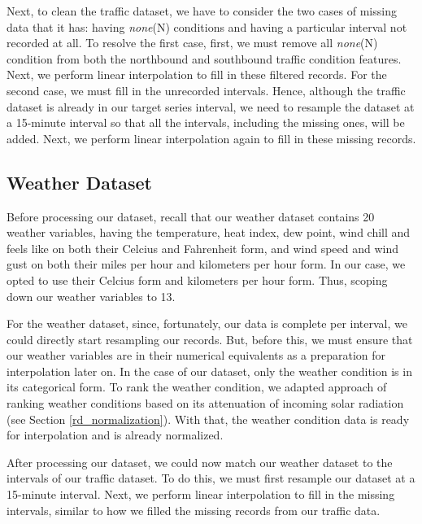 Next, to clean the traffic dataset, we have to consider the two cases of missing data that it has: having \textit{none}(N) conditions and having a particular interval not recorded at all. To resolve the first case, first, we must remove all \textit{none}(N) condition from both the northbound and southbound traffic condition features. Next, we perform linear interpolation to fill in these filtered records. For the second case, we must fill in the unrecorded intervals. Hence, although the traffic dataset is already in our target series interval, we need to resample the dataset at a 15-minute interval so that all the intervals, including the missing ones, will be added. Next, we perform linear interpolation again to fill in these missing records.



\subsection{Weather Dataset}
Before processing our dataset, recall that our weather dataset contains 20 weather variables, having the temperature, heat index, dew point, wind chill and feels like on both their Celcius and Fahrenheit form, and wind speed and wind gust on both their miles per hour and kilometers per hour form. In our case, we opted to use their Celcius form and kilometers per hour form. Thus, scoping down our weather variables to 13.

For the weather dataset, since, fortunately, our data is complete per interval, we could directly start resampling our records. But, before this, we must ensure that our weather variables are in their numerical equivalents as a preparation for interpolation later on. In the case of our dataset, only the weather condition is in its categorical form. To rank the weather condition, we adapted  approach of ranking weather conditions based on its attenuation of incoming solar radiation (see Section \ref{rd_normalization}). With that, the weather condition data is ready for interpolation and is already normalized.

After processing our dataset, we could now match our weather dataset to the intervals of our traffic dataset. To do this, we must first resample our dataset at a 15-minute interval. Next, we perform linear interpolation to fill in the missing intervals, similar to how we filled the missing records from our traffic data.

